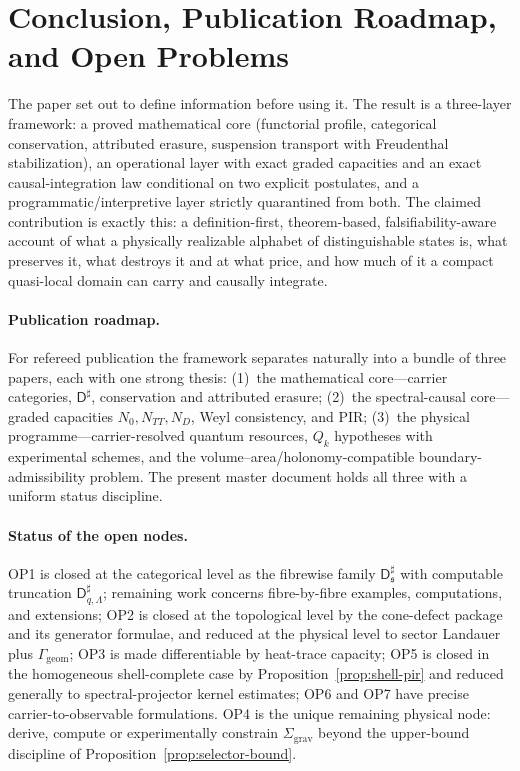 \documentclass[11pt,a4paper]{article}
\theoremstyle{definition}
\theoremstyle{remark}
\newcommand{\Dsharp}{\mathsf{D}^{\sharp}}
\newcommand{\PIR}{\mathrm{PIR}}
\begin{document}
\section{Conclusion, Publication Roadmap, and Open Problems}
\label{sec:open}

The paper set out to define information before using it.  The result is a three-layer
framework: a proved mathematical core (functorial profile, categorical conservation, attributed
erasure, suspension transport with Freudenthal stabilization), an operational layer with exact
graded capacities and an exact causal-integration law conditional on two explicit postulates,
and a programmatic/interpretive layer strictly quarantined from both.  The claimed contribution
is exactly this: a definition-first, theorem-based, falsifiability-aware account of what a
physically realizable alphabet of distinguishable states is, what preserves it, what destroys
it and at what price, and how much of it a compact quasi-local domain can carry and causally
integrate.

\paragraph{Publication roadmap.}
For refereed publication the framework separates naturally into a bundle of three papers, each
with one strong thesis: (1)~the mathematical core---carrier categories, $\Dsharp$,
conservation and attributed erasure; (2)~the spectral-causal core---graded capacities
$N_{0},N_{TT},N_{D}$, Weyl consistency, and $\PIR$; (3)~the physical
programme---carrier-resolved quantum resources, $Q_{k}$ hypotheses with experimental schemes,
and the volume--area/holonomy-compatible boundary-admissibility problem.  The present master document holds all three with a
uniform status discipline.

\paragraph{Status of the open nodes.}
OP1 is closed at the categorical level as the fibrewise family $\Dsharp_{\mathfrak s}$ with computable truncation
$\Dsharp_{q,\Lambda}$; remaining work concerns fibre-by-fibre examples, computations, and extensions; OP2 is closed at the topological level by the cone-defect package and
its generator formulae, and reduced at the physical level to sector Landauer plus
$\Gamma_{\mathrm{geom}}$; OP3 is made differentiable by heat-trace capacity; OP5 is closed in
the homogeneous shell-complete case by Proposition~\ref{prop:shell-pir} and reduced generally
to spectral-projector kernel estimates; OP6 and OP7 have precise carrier-to-observable
formulations.  OP4 is the unique remaining physical node: derive, compute or experimentally constrain
$\Sigma_{\mathrm{grav}}$ beyond the upper-bound discipline of Proposition~\ref{prop:selector-bound}.
\end{document}
